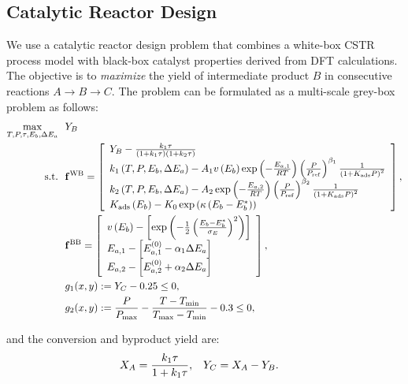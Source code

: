 \documentclass[12pt,a4paper]{article}%
\theoremstyle{plain}%
\theoremstyle{remark}%
\theoremstyle{definition}%
\def\WB{\mathrm{WB}}
\def\BB{\mathrm{BB}}
\newcommand{\bff}{{\bf f}}
\providecommand{\DIFaddtex}[1]{{\protect\color{blue}\uwave{#1}}} %
\providecommand{\DIFaddbegin}{} %
\providecommand{\DIFaddend}{} %
\providecommand{\DIFadd}[1]{\texorpdfstring{\DIFaddtex{#1}}{#1}} %
\newcommand{\DIFaddincludegraphics}[2][]{{\color{blue}\fbox{\DIFOincludegraphics[#1]{#2}}}} %
\DeclareRobustCommand{\DIFaddbegin}{\DIFOaddbegin \let\includegraphics\DIFaddincludegraphics} %
\DeclareRobustCommand{\DIFaddend}{\DIFOaddend \let\includegraphics\DIFOincludegraphics} %
\begin{document}
\begin{appendices}
\subsection{Catalytic Reactor Design}\label{subsec:app_cstr}
We use a catalytic reactor design problem that combines a white-box CSTR process model with black-box catalyst properties \DIFaddbegin \DIFadd{akin to those }\DIFaddend derived from DFT calculations. The objective is to \emph{maximize} the yield of intermediate product $B$ in consecutive reactions $A \to B \to C$. The problem can be formulated as a multi-scale grey-box problem as follows:
\begin{align} \label{eq:CSTR}
    \max_{T, P, \tau, E_b, \Delta E_a} &~~ Y_B \\\notag
    \text{s.t.} &~~ \bff^\WB=\left[
        \begin{array}{l}
            Y_B-\frac{k_1 \tau}{\left(1+k_1 \tau\right)\left(1+k_2 \tau\right)} \\
            k_1\left(T, P, E_b, \Delta E_a\right)-A_1 v\left(E_b\right) \exp \left(-\frac{E_{a, 1}}{R T}\right)\left(\frac{P}{P_{\mathrm{ref}}}\right)^{\beta_1} \frac{1}{\left(1+K_{\mathrm{ads}} P\right)^2} \\
            k_2\left(T, P, E_b, \Delta E_a\right)-A_2 \exp \left(-\frac{E_{a, 2}}{R T}\right)\left(\frac{P}{P_{\mathrm{ref}}}\right)^{\beta_2} \frac{1}{\left(1+K_{\mathrm{ads}} P\right)^2} \\
            K_{\mathrm{ads}}\left(E_b\right) - K_0 \exp\left(\kappa \left(E_b - E_b^*\right)\right)
        \end{array}\right], \\\notag
    &~~ \bff^\BB=\left[
        \begin{array}{l}
            v\left(E_b\right)-\left[\exp \left(-\frac{1}{2}\left(\frac{E_b-E_b^*}{\sigma_E}\right)^2\right)\right] \\
            E_{a, 1}-\left[E_{a, 1}^{(0)}-\alpha_1 \Delta E_a\right] \\
            E_{a, 2}-\left[E_{a, 2}^{(0)}+\alpha_2 \Delta E_a\right]
        \end{array}\right], \\\notag
    &~~ g_1(x, y) := Y_C - 0.25 \leq 0, \\\notag
    &~~ g_2(x, y) := \frac{P}{P_{\max}} - \frac{T - T_{\min}}{T_{\max} - T_{\min}} - 0.3 \leq 0,
\end{align}

and the conversion and byproduct yield are:
\begin{align}\notag
    X_A &= \frac{k_1 \tau}{1 + k_1 \tau}, & Y_C &= X_A - Y_B.
\end{align}


\end{appendices}
\end{document}
